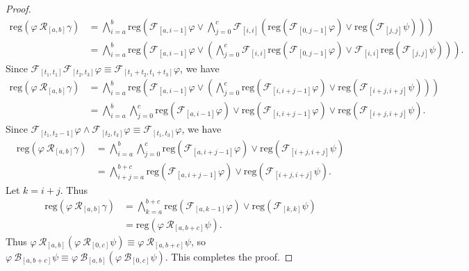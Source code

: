 \documentclass[runningheads]{llncs}
\renewcommand{\phi}{\varphi}
\begin{document}
\begin{proof}
\begin{align*}
\text{reg}\left(\phi \ \mathcal{R}_{[a,b]}\gamma\right) &= \bigwedge_{i=a}^{b} \text{reg}\left(\mathcal{F}_{[a,i-1]}\phi \lor  \bigwedge_{j=0}^{c} \mathcal{F}_{[i, i]}\left( \text{reg}\left(\mathcal{F}_{[0,j-1]}\phi\right) \lor \text{reg}\left(\mathcal{F}_{[j, j]}\psi\right) \right) \right) \\
&= \bigwedge_{i=a}^{b} \text{reg}\left(\mathcal{F}_{[a,i-1]}\phi \lor \left( \bigwedge_{j=0}^{c} \mathcal{F}_{[i, i]}\text{reg}\left(\mathcal{F}_{[0,j-1]}\phi\right) \lor \mathcal{F}_{[i, i]}\text{reg}\left(\mathcal{F}_{[j, j]}\psi \right) \right) \right).
\end{align*}
Since $\mathcal{F}_{[t_1,t_1]}\mathcal{F}_{[t_2,t_3]} \phi \equiv \mathcal{F}_{[t_1+t_2,t_1+t_3]} \phi$, we have
\begin{align*}
\text{reg}\left(\phi \ \mathcal{R}_{[a,b]}\gamma\right) &= \bigwedge_{i=a}^{b} \text{reg}\left(\mathcal{F}_{[a,i-1]}\phi \lor \left( \bigwedge_{j=0}^{c} \text{reg}\left(\mathcal{F}_{[i,i+j-1]}\phi\right) \lor \text{reg}\left(\mathcal{F}_{[i+j, i+j]}\psi \right) \right) \right) \\
&= \bigwedge_{i=a}^{b}  \bigwedge_{j=0}^{c} \text{reg}\left(\mathcal{F}_{[a,i-1]}\phi\right) \lor  \text{reg}\left(\mathcal{F}_{[i,i+j-1]}\phi\right) \lor \text{reg}\left(\mathcal{F}_{[i+j, i+j]}\psi \right).
\end{align*}
Since $\mathcal{F}_{[t_1,t_2-1]} \phi \land \mathcal{F}_{[t_2,t_3]} \phi \equiv \mathcal{F}_{[t_1, t_3]} \phi$, we have
\begin{align*}
\text{reg}\left(\phi \ \mathcal{R}_{[a,b]}\gamma\right) &= \bigwedge_{i=a}^{b}  \bigwedge_{j=0}^{c} \text{reg}\left(\mathcal{F}_{[a,i+j-1]}\phi\right) \lor \text{reg}\left(\mathcal{F}_{[i+j, i+j]}\psi  \right) \\
&= \bigwedge_{i+j=a}^{b+c} \text{reg}\left(\mathcal{F}_{[a,i+j-1]}\phi\right) \lor \text{reg}\left(\mathcal{F}_{[i+j, i+j]}\psi  \right).
\end{align*}
Let $k = i + j$. Thus
\begin{align*}
\text{reg}\left(\phi \ \mathcal{R}_{[a,b]}\gamma\right) &= \bigwedge_{k=a}^{b+c} \text{reg}\left(\mathcal{F}_{[a,k-1]}\phi\right) \lor \text{reg}\left(\mathcal{F}_{[k, k]}\psi  \right) \\
&= \text{reg}\left(\phi \ \mathcal{R}_{[a,b+c]} \psi\right).
\end{align*}
Thus  $\phi \ \mathcal{R}_{[a,b]}(\phi \ \mathcal{R}_{[0,c]} \psi) \equiv \phi \ \mathcal{R}_{[a,b+c]} \psi$, so $\phi \ \mathcal{B}_{[a,b+c]} \psi \equiv \phi \ \mathcal{B}_{[a,b]}(\phi \ \mathcal{B}_{[0,c]} \psi)$. This completes the proof.
\end{proof}
\end{document}
